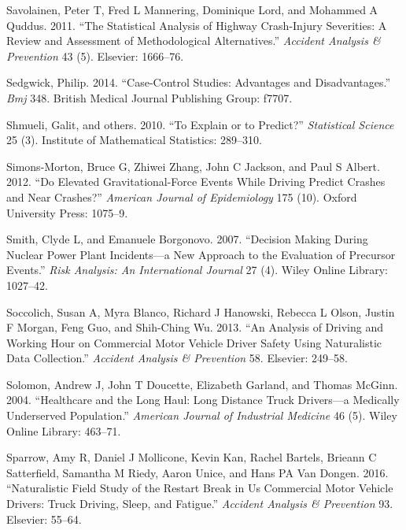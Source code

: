 \documentclass[12pt]{book}
\numberwithin{equation}{chapter}
\begin{document}
\leavevmode\hypertarget{ref-savolainen2011statistical}{}%
Savolainen, Peter T, Fred L Mannering, Dominique Lord, and Mohammed A Quddus. 2011. ``The Statistical Analysis of Highway Crash-Injury Severities: A Review and Assessment of Methodological Alternatives.'' \emph{Accident Analysis \& Prevention} 43 (5). Elsevier: 1666--76.

\leavevmode\hypertarget{ref-sedgwick2014case}{}%
Sedgwick, Philip. 2014. ``Case-Control Studies: Advantages and Disadvantages.'' \emph{Bmj} 348. British Medical Journal Publishing Group: f7707.

\leavevmode\hypertarget{ref-shmueli2010explain}{}%
Shmueli, Galit, and others. 2010. ``To Explain or to Predict?'' \emph{Statistical Science} 25 (3). Institute of Mathematical Statistics: 289--310.

\leavevmode\hypertarget{ref-simons2012elevated}{}%
Simons-Morton, Bruce G, Zhiwei Zhang, John C Jackson, and Paul S Albert. 2012. ``Do Elevated Gravitational-Force Events While Driving Predict Crashes and Near Crashes?'' \emph{American Journal of Epidemiology} 175 (10). Oxford University Press: 1075--9.

\leavevmode\hypertarget{ref-smith2007decision}{}%
Smith, Clyde L, and Emanuele Borgonovo. 2007. ``Decision Making During Nuclear Power Plant Incidents---a New Approach to the Evaluation of Precursor Events.'' \emph{Risk Analysis: An International Journal} 27 (4). Wiley Online Library: 1027--42.

\leavevmode\hypertarget{ref-soccolich2013analysis}{}%
Soccolich, Susan A, Myra Blanco, Richard J Hanowski, Rebecca L Olson, Justin F Morgan, Feng Guo, and Shih-Ching Wu. 2013. ``An Analysis of Driving and Working Hour on Commercial Motor Vehicle Driver Safety Using Naturalistic Data Collection.'' \emph{Accident Analysis \& Prevention} 58. Elsevier: 249--58.

\leavevmode\hypertarget{ref-solomon2004healthcare}{}%
Solomon, Andrew J, John T Doucette, Elizabeth Garland, and Thomas McGinn. 2004. ``Healthcare and the Long Haul: Long Distance Truck Drivers---a Medically Underserved Population.'' \emph{American Journal of Industrial Medicine} 46 (5). Wiley Online Library: 463--71.

\leavevmode\hypertarget{ref-sparrow2016naturalistic}{}%
Sparrow, Amy R, Daniel J Mollicone, Kevin Kan, Rachel Bartels, Brieann C Satterfield, Samantha M Riedy, Aaron Unice, and Hans PA Van Dongen. 2016. ``Naturalistic Field Study of the Restart Break in Us Commercial Motor Vehicle Drivers: Truck Driving, Sleep, and Fatigue.'' \emph{Accident Analysis \& Prevention} 93. Elsevier: 55--64.
\end{document}
